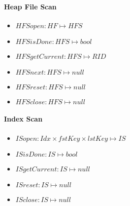 \paragraph{Heap File Scan}

\begin{itemize}
    \item $HFSopen : HF \mapsto HFS$

    \item $HFSisDone : HFS \mapsto bool$

    \item $HFSgetCurrent : HFS \mapsto RID$

    \item $HFSnext : HFS \mapsto null$

    \item $HFSreset : HFS \mapsto null$

    \item $HFSclose : HFS \mapsto null$
\end{itemize}

\paragraph{Index Scan}

\begin{itemize}
    \item $ISopen : Idx \times fstKey \times lstKey \mapsto IS$

    \item $ISisDone : IS \mapsto bool$

    \item $ISgetCurrent : IS \mapsto null$

    \item $ISreset : IS \mapsto null$

    \item $ISclose : IS \mapsto null$
\end{itemize}